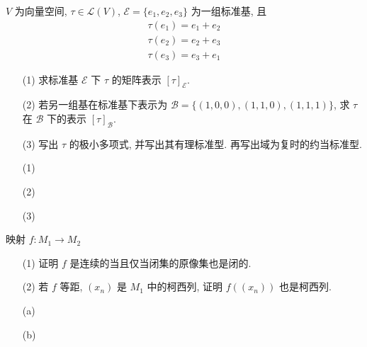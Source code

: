 \documentclass{assignment}
\begin{document}
\begin{prob}
    $V$ 为向量空间, $\tau\in\mathcal{L}(V)$, $\mathcal{E}=\{e_1,e_2,e_3\}$ 为一组标准基, 且
    \[
        \begin{array}{l}
            \tau(e_1)=e_1+e_2\\
            \tau(e_2)=e_2+e_3\\
            \tau(e_3)=e_3+e_1
        \end{array}
    \]
    \begin{itemize}
        \item[(1)] 求标准基 $\mathcal{E}$ 下 $\tau$ 的矩阵表示 $[\tau]_{\mathcal{E}}$.
        \item[(2)] 若另一组基在标准基下表示为 $\mathcal{B}=\{(1,0,0),(1,1,0),(1,1,1)\}$, 求 $\tau$ 在 $\mathcal{B}$ 下的表示 $[\tau]_{\mathcal{B}}$.
        \item[(3)] 写出 $\tau$ 的极小多项式, 并写出其有理标准型. 再写出域为复时的约当标准型.
    \end{itemize}
\end{prob}
\begin{sol}
    \begin{itemize}
        \item[(1)] 
        \item[(2)] 
        \item[(3)] 
    \end{itemize}
\end{sol}

\begin{prob}
    映射 $f:M_1\rightarrow M_2$
    \begin{itemize}
        \item[(1)] 证明 $f$ 是连续的当且仅当闭集的原像集也是闭的.
        \item[(2)] 若 $f$ 等距, $(x_n)$ 是 $M_1$ 中的柯西列, 证明 $f((x_n))$ 也是柯西列.
    \end{itemize}
\end{prob}
\begin{sol}
    \begin{itemize}
        \item[(a)] 
        \item[(b)] 
    \end{itemize}
\end{sol}
\end{document}

